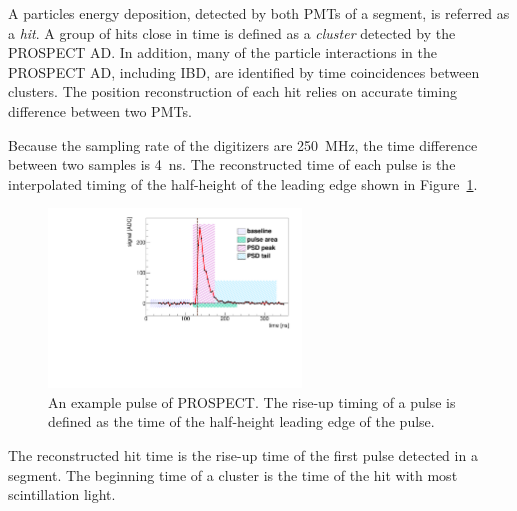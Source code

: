 
A particles energy deposition, detected by both PMTs of a segment, is referred as a \textit{hit}.
A group of hits close in time is defined as a \textit{cluster} detected by the PROSPECT AD. 
In addition, many of the particle interactions in the PROSPECT AD, including IBD, are identified by time coincidences between clusters.
The position reconstruction of each hit relies on accurate timing difference between two PMTs.

Because the sampling rate of the digitizers are 250~MHz, the time difference between two samples is 4~ns.
The reconstructed time of each pulse is the interpolated timing of the half-height of the leading edge shown in Figure~\ref{fig:PulseTiming}.
\begin{figure}[ht]
\centering
\includegraphics[width=0.6\textwidth]{Figures/PulseTiming.pdf}
\caption[Pulse timing reconstruction]{
An example pulse of PROSPECT. 
The rise-up timing of a pulse is defined as the time of the half-height leading edge of the pulse.
}
\label{fig:PulseTiming}
\end{figure}	

The reconstructed hit time is the rise-up time of the first pulse detected in a segment.
The beginning time of a cluster is the time of the hit with most scintillation light.

